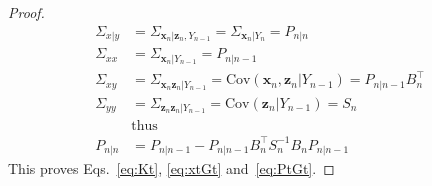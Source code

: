 \begin{proof}
{		\begin{align*}
			\Sigma_{x|y}&=\Sigma_{\mathbf{x}_n|\mathbf{z}_n,Y_{n-1}}=\Sigma_{\mathbf{x}_n|Y_n}=P_{n|n}\\
			\Sigma_{xx}&=\Sigma_{\mathbf{x}_n|Y_{n-1}}=P_{n|n-1}\\
			\Sigma_{xy}&=\Sigma_{\mathbf{x}_n\mathbf{z}_n|Y_{n-1}}=\text{Cov}(\mathbf{x}_n,\mathbf{z}_n|Y_{n-1})=P_{n|n-1}B_n^\intercal\\
			\Sigma_{yy}&=\Sigma_{\mathbf{z}_n\mathbf{z}_n|Y_{n-1}}=\text{Cov}(\mathbf{z}_n|Y_{n-1})=S_n\\
                        &\text{thus}\\
            P_{n|n}&=P_{n|n-1}-P_{n|n-1}B_n^\intercal S_n^{-1}B_nP_{n|n-1}
		\end{align*}
    }
	This proves Eqs.~\ref{eq:Kt}, \ref{eq:xtGt} and~\ref{eq:PtGt}.

\end{proof}
